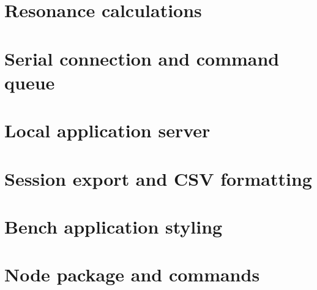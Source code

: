 \section{Resonance calculations}




\section{Serial connection and command queue}




\section{Local application server}




\section{Session export and CSV formatting}




\section{Bench application styling}




\section{Node package and commands}


